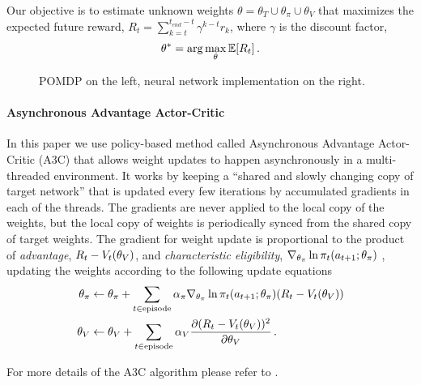 Our objective is to estimate unknown weights $\theta = \theta_T \cup \theta_\pi \cup \theta_V$ that maximizes the expected future reward, $R_t = \sum_{k=t}^{t_{end} - t} \gamma^{k-t} r_k$, where $\gamma$ is the discount factor,
%
\begin{align}
\theta^* = \arg\max_{\theta} \mathbb{E}[R_t] \,.
\end{align}
%
\def\svgwidth{0.5\columnwidth}%
\begin{figure}%
%
\def\svgwidth{0.5\columnwidth}%

\caption{POMDP on the left, neural network implementation on the right.}
\end{figure}

\paragraph{Asynchronous Advantage Actor-Critic}
\def\charelig{\nabla_{\theta_\pi}\ln \pit(\acttn; \theta_\pi)}
In this paper we use policy-based method called Asynchronous Advantage Actor-Critic (A3C) \cite{MnBaMiICML2016} that allows weight updates to happen asynchronously in a multi-threaded environment.
It works by keeping a ``shared and slowly changing copy of target network'' that is updated every few iterations by accumulated gradients in each of the threads.
The gradients are never applied to the local copy of the weights, but the local copy of weights is periodically synced from the shared copy of target weights.
The gradient for weight update is proportional to the product of \emph{advantage}, $R_t - V_t(\theta_V)$, and \emph{characteristic eligibility}, $\charelig$ \cite{WiML1992}, updating the weights according to the following update equations
\begin{align}
  \theta_\pi &\leftarrow \theta_\pi
  + \sum_{t \in \text{episode}}\alpha_\pi \charelig (R_t - \Value_t(\theta_\Value))
  \\
  \theta_\Value &\leftarrow \theta_\Value
  + \sum_{t \in \text{episode}} \alpha_\Value \frac{\partial (R_t - \Value_t(\theta_\Value))^2}
                  {\partial\theta_\Value}
                  \, .
\end{align}

For more details of the A3C algorithm please refer to \cite{MnBaMiICML2016}.
